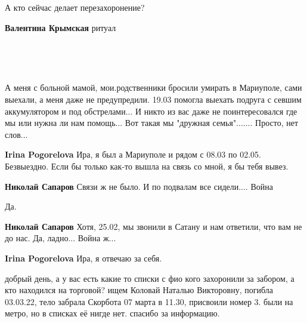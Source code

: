 
А кто сейчас делает перезахоронение?

\begin{itemize} %
\textbf{Валентина Крымская} ритуал
\end{itemize} %

🙏 🙏 🙏

🙏🏻


А меня с больной мамой, мои.родственники бросили умирать в Мариуполе, сами
выехали, а меня даже не предупредили. 19.03 помогла выехать подруга с севшим
аккумулятором и под обстрелами... И никто из вас даже не поинтересовался где мы
или нужна ли нам помощь... Вот такая мы "дружная семья"....... Просто, нет
слов...

\begin{itemize} %
\textbf{Irina Pogorelova} Ира, я был а Мариуполе и рядом с 08.03 по 02.05. Безвыездно. Если бы только как-то вышла на связь со мной, я бы тебя вывез.

\textbf{Николай Сапаров} Связи ж не было. И по подвалам все сидели.... Война


Да.

\textbf{Николай Сапаров} Хотя, 25.02, мы звонили в Сатану и нам ответили, что вам не до нас. Да, ладно... Война ж...

\textbf{Irina Pogorelova} Ира, я отвечаю за себя.
\end{itemize} %


добрый день, а у вас есть какие то списки с фио кого захоронили за забором, а
кто находился на торговой? ищем Коловай Наталью Викторовну, погибла 03.03.22,
тело забрала Скорбота 07 марта в 11.30, присвоили номер 3. были на метро, но в
списках её нигде нет. спасибо за информацию.

